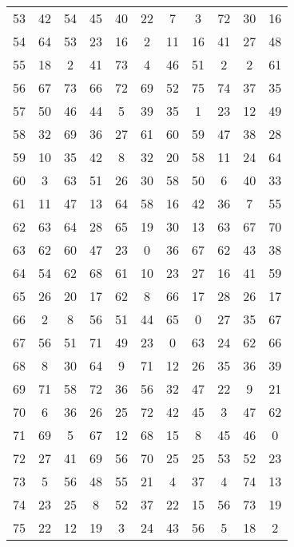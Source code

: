 \begin{table}
\begin{tabular}{c c c c c c c c c c c }
53 & 42 & 54 & 45 & 40 & 22 & 7 & 3 & 72 & 30 & 16 \\
54 & 64 & 53 & 23 & 16 & 2 & 11 & 16 & 41 & 27 & 48 \\
55 & 18 & 2 & 41 & 73 & 4 & 46 & 51 & 2 & 2 & 61 \\
56 & 67 & 73 & 66 & 72 & 69 & 52 & 75 & 74 & 37 & 35 \\
57 & 50 & 46 & 44 & 5 & 39 & 35 & 1 & 23 & 12 & 49 \\
58 & 32 & 69 & 36 & 27 & 61 & 60 & 59 & 47 & 38 & 28 \\
59 & 10 & 35 & 42 & 8 & 32 & 20 & 58 & 11 & 24 & 64 \\
60 & 3 & 63 & 51 & 26 & 30 & 58 & 50 & 6 & 40 & 33 \\
61 & 11 & 47 & 13 & 64 & 58 & 16 & 42 & 36 & 7 & 55 \\
62 & 63 & 64 & 28 & 65 & 19 & 30 & 13 & 63 & 67 & 70 \\
63 & 62 & 60 & 47 & 23 & 0 & 36 & 67 & 62 & 43 & 38 \\
64 & 54 & 62 & 68 & 61 & 10 & 23 & 27 & 16 & 41 & 59 \\
65 & 26 & 20 & 17 & 62 & 8 & 66 & 17 & 28 & 26 & 17 \\
66 & 2 & 8 & 56 & 51 & 44 & 65 & 0 & 27 & 35 & 67 \\
67 & 56 & 51 & 71 & 49 & 23 & 0 & 63 & 24 & 62 & 66 \\
68 & 8 & 30 & 64 & 9 & 71 & 12 & 26 & 35 & 36 & 39 \\
69 & 71 & 58 & 72 & 36 & 56 & 32 & 47 & 22 & 9 & 21 \\
70 & 6 & 36 & 26 & 25 & 72 & 42 & 45 & 3 & 47 & 62 \\
71 & 69 & 5 & 67 & 12 & 68 & 15 & 8 & 45 & 46 & 0 \\
72 & 27 & 41 & 69 & 56 & 70 & 25 & 25 & 53 & 52 & 23 \\
73 & 5 & 56 & 48 & 55 & 21 & 4 & 37 & 4 & 74 & 13 \\
74 & 23 & 25 & 8 & 52 & 37 & 22 & 15 & 56 & 73 & 19 \\
75 & 22 & 12 & 19 & 3 & 24 & 43 & 56 & 5 & 18 & 2 \\
\hline
\end{tabular}
\end{table}